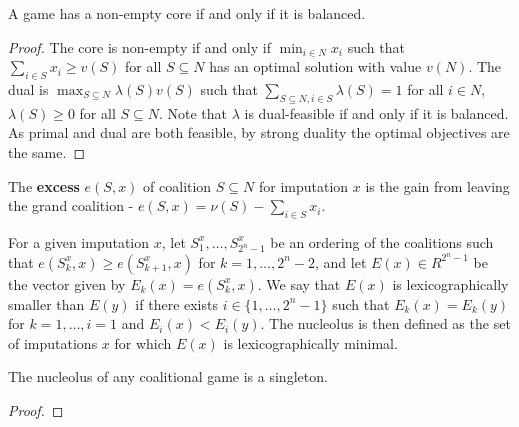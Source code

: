 \begin{thm}
  \label{sec:cooperative-games-3}
  A game has a non-empty core if and only if it is balanced.
\end{thm}

\begin{proof}
  The core is non-empty if and only if $\min_{i \in N} x_{i}$ such
  that $\sum_{i \in S} x_{i} \geq v(S)$ for all $S \subseteq N$ has an
  optimal solution with value $v(N)$. The dual is $\max_{S \subseteq N}
  \lambda(S) v(S)$ such that $\sum_{S \subseteq N, i \in S} \lambda(S)
  = 1$ for all $i \in N$, $\lambda(S) \geq 0$ for all $S \subseteq N$.
  Note that $\lambda$ is dual-feasible if and only if it is balanced.
  As primal and dual are both feasible, by strong duality the optimal
  objectives are the same.
\end{proof}


\begin{defn}
  \label{sec:cooperative-games-5}
  The \textbf{excess} $e(S, x)$ of coalition $S \subseteq N$ for
  imputation $x$ is the gain from leaving the grand coalition - $e(S,
  x) = \nu(S) - \sum_{i \in S}^{} x_{i}$.

  For a given imputation $x$, let $S_{1}^{x}, \dots, S_{2^{n}-1}^{x}$
  be an ordering of the coalitions such that $e(S^{x}_{k}, x) \geq
  e(S_{k+1}^{x}, x)$ for $k = 1, \dots, 2^{n} - 2$, and let $E(x) \in
  R^{2^{n} - 1}$ be the vector given by $E_{k}(x) = e(S_{k}^{x}, x)$.
  We say that $E(x)$ is lexicographically smaller than $E(y)$ if there
  exists $i \in \{ 1, \dots, 2^{n} - 1 \} $ such that $E_{k}(x) =
  E_{k}(y)$ for $k = 1, \dots, i=1$ and $E_{i} (x) < E_{i}(y)$. The
  nucleolus is then defined as the set of imputations $x$ for which
  $E(x)$ is lexicographically minimal.
\end{defn}

\begin{thm}
  \label{sec:cooperative-games-6}
  The nucleolus of any coalitional game is a singleton.
\end{thm}

\begin{proof}
\end{proof}

